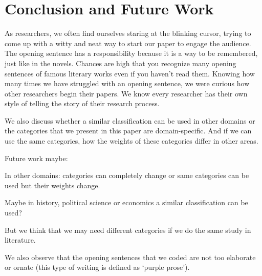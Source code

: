 \documentclass[sigconf]{acmart}
\begin{document}
	\section{Conclusion and Future Work}
	
	As researchers, we often find ourselves staring at the blinking cursor, trying to come up with a witty and neat way to start our paper to engage the audience. The opening sentence has a responsibility because it is a way to be remembered, just like in the novels. Chances are high that you recognize many opening sentences of famous literary works even if you haven’t read them. Knowing how many times we have struggled with an opening sentence, we were curious how other researchers begin their papers. We know every researcher has their own style of telling the story of their research process. 
	
	We also discuss whether a similar classification can be used in other domains or the categories that we present in this paper are domain-specific. And if we can use the same categories, how the weights of these categories differ in other areas.
	
	Future work maybe:
	
	In other domains: categories can completely change or same categories can be used but their weights change.
	
	Maybe in history, political science or economics a similar classification can be used?
	
	But we think that we may need different categories if we do the same study in literature. 
	
	
	We also observe that the opening sentences that we coded are not too elaborate or ornate (this type of writing is defined as `purple prose').
	
	
	
	
	
\end{document}
